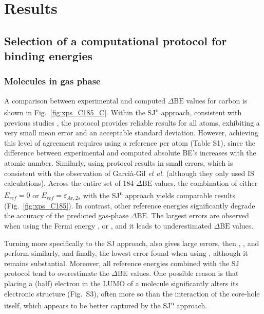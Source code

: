 \documentclass[%
aip,
amsmath,amssymb,
preprint,%
jcp,
showkeys,
]{revtex4-2}
\def\dbe{\ensuremath{\Delta\text{BE}}}
\begin{document}
\clearpage



\section{Results}\label{sec:results}


\subsection{Selection of a computational protocol for binding energies}\label{sec:proto}

\subsubsection{Molecules in gas phase}

A comparison between experimental and computed \dbe{} values for carbon is shown in Fig.~\ref{fig:xps_C185_C}. Within the SJ\textsuperscript{n} approach, consistent with previous studies \cite{pueyobellafontPredictingCoreLevel2017,golzeAccurateAbsoluteRelative2020}, the  protocol provides reliable results for all atoms, exhibiting a very small mean error and an acceptable standard deviation. However, achieving this level of agreement requires using a reference per atom (Table S1), since the difference between experimental and computed absolute BE's increases with the atomic number. Similarly, using  protocol results in small errors, which is consistent with the observation of Garcià-Gil \textit{et al.}\cite{garcia-gilCalculationCoreLevel2012} (although they only used IS calculations). Across the entire set of 184 \dbe{} values, the combination of either $E_{ref}=0$ or $E_{ref}=\varepsilon_{Ar,2s}$ with the SJ\textsuperscript{n} approach yields comparable results (Fig.~\ref{fig:xps_C185}). In contrast, other reference energies significantly degrade the accuracy of the predicted gas-phase \dbe{}. The largest errors are observed when using the Fermi energy , or , and it leads to underestimated \dbe{} values. 

Turning more specifically to the SJ approach,  also gives large errors, then , , and  perform similarly, and finally, the lowest error found when using \cpx{\phi}, although it remains substantial. Moreover, all reference energies combined with the SJ protocol tend to overestimate the \dbe{} values. One possible reason is that placing a (half) electron in the LUMO of a molecule significantly alters its electronic structure (Fig.~S3), often more so than the interaction of the core-hole itself, which appears to be better captured by the SJ\textsuperscript{n} approach.\cite{taucherFinalStateSimulationsCoreLevel2020}
\end{document}
